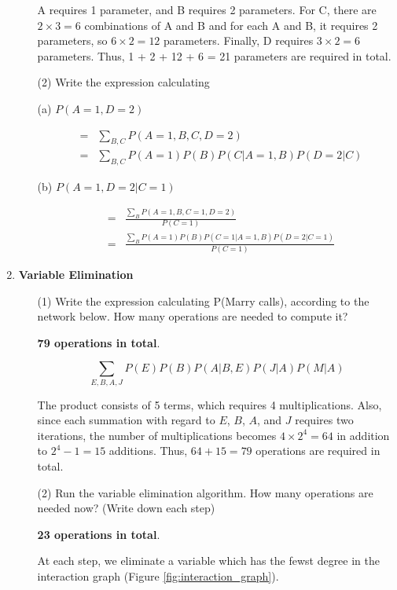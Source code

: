 \begin{enumerate}
\begin{enumerate}
A requires 1 parameter, and B requires 2 parameters. For C, there are $2 \times 3 = 6$ combinations of A and B and for each A and B, it requires 2 parameters, so $6 \times 2 = 12$ parameters. Finally, D requires $3 \times 2 = 6$ parameters. Thus, 1 + 2 + 12 + 6 = 21 parameters are required in total.

\item[(2)] Write the expression calculating 

(a) $P(A=1, D=2)$ 

\begin{eqnarray}
& = & \sum_{B,C} P(A=1,B,C,D=2) \nonumber \\
& = & \sum_{B,C} P(A=1)P(B)P(C|A=1,B)P(D=2|C) \nonumber
\end{eqnarray}

(b) $P(A=1,D=2|C=1)$

\begin{eqnarray}
& = & \frac{\sum_B P(A=1,B,C=1,D=2)}{P(C=1)} \nonumber \\
& = & \frac{\sum_B P(A=1)P(B)P(C=1|A=1,B)P(D=2|C=1)}{P(C=1)} \nonumber
\end{eqnarray}

\end{enumerate}

\item {\bf Variable Elimination}

\begin{enumerate}

\item[(1)] Write the expression calculating P(Marry calls), according to the network below. How many operations are needed to compute it?

{\bf 79 operations in total}.

\[
\sum_{E,B,A,J} P(E)P(B)P(A|B,E)P(J|A)P(M|A)
\]

The product consists of 5 terms, which requires 4 multiplications. Also, since each summation with regard to $E$, $B$, $A$, and $J$ requires two iterations, the number of multiplications becomes $4 \times 2^4 = 64$ in addition to $2^4-1=15$ additions. Thus, $64+15=79$ operations are required in total.

\item[(2)] Run the variable elimination algorithm. How many operations are needed now? (Write down each step)

{\bf 23 operations in total}.

At each step, we eliminate a variable which has the fewst degree in the interaction graph (Figure \ref{fig:interaction_graph}).


\end{enumerate}
\end{enumerate}
